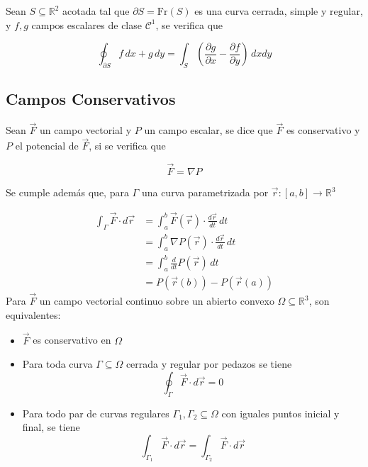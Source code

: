 Sean $S\subseteq\mathbb{R}^2$ acotada tal que $\partial S = \mathrm{Fr}(S)$ es una curva cerrada, simple y regular, y $f,g$ campos escalares de clase $\mathcal{C}^1$, se verifica que

\[\oint_{\partial S}f\,dx+g\,dy = \int_S
\left(\frac{\partial g}{\partial x}-
\frac{\partial f}{\partial y}\right)\,dxdy\]

\subsection{Campos Conservativos}

Sean $\Vec{F}$ un campo vectorial y $P$ un campo escalar, se dice que $\Vec{F}$ es conservativo y $P$ el potencial de $\Vec{F}$, si se verifica que

\[\Vec{F} = \nabla P\] %



\bigbreak
Se cumple además que, para $\Gamma$ una curva parametrizada por $\Vec{r}:[a,b]\to\mathbb{R}^3$

\begin{equation}
\begin{split}
    \int_\Gamma\Vec{F}\cdot d\Vec{r} &=
    \int^b_a\Vec{F}(\Vec{r})\cdot\frac{d\Vec{r}}{dt}\,dt\\
    &=\int^b_a\nabla P(\Vec{r})\cdot\frac{d\Vec{r}}{dt}\,dt\\
    &=\int^b_a\frac{d}{dt} P(\Vec{r})\,dt\\
    &=P(\Vec{r}(b))-P(\Vec{r}(a))
\end{split}
\nonumber
\end{equation}
\bigbreak
Para $\Vec{F}$ un campo vectorial continuo sobre un abierto convexo $\Omega\subseteq\mathbb{R}^3$, son equivalentes:

\begin{itemize}
    \item $\Vec{F}$ es conservativo en $\Omega$
    \item Para toda curva $\Gamma\subseteq\Omega$ cerrada y regular por pedazos se tiene
    \[\oint_\Gamma\Vec{F}\cdot d\Vec{r}=0\]
    \item Para todo par de curvas regulares $\Gamma_1, \Gamma_2\subseteq\Omega$ con iguales puntos inicial y final, se tiene
    \[\int_{\Gamma_1}\Vec{F}\cdot d\Vec{r} =
    \int_{\Gamma_2}\Vec{F}\cdot d\Vec{r}\]
\end{itemize}

\newpage
